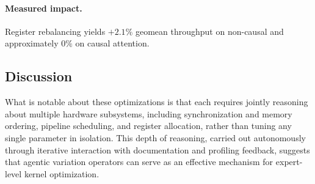 \paragraph{Measured impact.}
Register rebalancing yields $+2.1\%$ geomean throughput on non-causal and approximately $0\%$ on causal attention.

\subsection{Discussion}
\label{sec:analysis_discussion}

What is notable about these optimizations is that each requires jointly reasoning about multiple hardware subsystems, including synchronization and memory ordering, pipeline scheduling, and register allocation, rather than tuning any single parameter in isolation.
This depth of reasoning, carried out autonomously through iterative interaction with documentation and profiling feedback, suggests that agentic variation operators can serve as an effective mechanism for expert-level kernel optimization.
